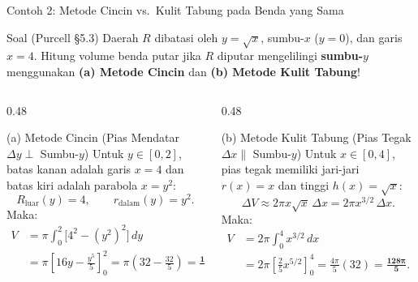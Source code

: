 \documentclass[aspectratio=43,10pt]{beamer}
\begin{document}
\begin{frame}{Contoh 2: Metode Cincin vs.\ Kulit Tabung pada Benda yang Sama}
    \begin{exampleblock}{Soal (Purcell \S5.3)}
        \scriptsize
        Daerah $R$ dibatasi oleh $y = \sqrt{x}$, sumbu-$x$ ($y = 0$), dan garis $x = 4$. Hitung volume benda putar jika $R$ diputar mengelilingi \textbf{sumbu-$y$} menggunakan \textbf{(a) Metode Cincin} dan \textbf{(b) Metode Kulit Tabung}!
    \end{exampleblock}

    \begin{columns}[T]
        \begin{column}{0.48\textwidth}
            \begin{block}{(a) Metode Cincin (Pias Mendatar $\Delta y \perp$ Sumbu-$y$)}
                \scriptsize\abovedisplayskip=2pt\belowdisplayskip=2pt
                Untuk $y \in [0, 2]$, batas kanan adalah garis $x = 4$ dan batas kiri adalah parabola $x = y^2$:
                $$R_{\text{luar}}(y) = 4, \qquad r_{\text{dalam}}(y) = y^2.$$
                Maka:
                \begin{align*}
                    V &= \pi\int_{0}^{2} \Big[4^2 - (y^2)^2\Big]\,dy\\
                    &= \pi\left[16y - \frac{y^5}{5}\right]_{0}^{2} = \pi\!\left(32 - \frac{32}{5}\right) = \mathbf{\frac{128\pi}{5}}.
                \end{align*}
            \end{block}
        \end{column}

        \begin{column}{0.48\textwidth}
            \begin{alertblock}{(b) Metode Kulit Tabung (Pias Tegak $\Delta x \parallel$ Sumbu-$y$)}
                \scriptsize\abovedisplayskip=2pt\belowdisplayskip=2pt
                Untuk $x \in [0, 4]$, pias tegak memiliki jari-jari $r(x) = x$ dan tinggi $h(x) = \sqrt{x}$:
                $$\Delta V \approx 2\pi x\sqrt{x}\,\Delta x = 2\pi x^{3/2}\,\Delta x.$$
                Maka:
                \begin{align*}
                    V &= 2\pi\int_{0}^{4} x^{3/2}\,dx\\
                    &= 2\pi\left[\frac{2}{5}x^{5/2}\right]_{0}^{4} = \frac{4\pi}{5}(32) = \mathbf{\frac{128\pi}{5}}.
                \end{align*}
            \end{alertblock}
        \end{column}
    \end{columns}
\end{frame}
\end{document}
